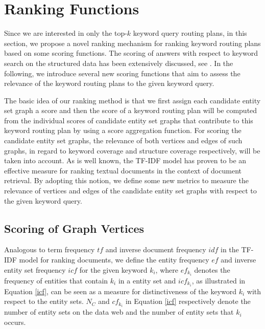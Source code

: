 \section{Ranking Functions}\label{qr:ranking}

Since we are interested in only the top-$k$ keyword query routing plans, in this section, we propose
a novel ranking mechanism for ranking keyword routing plans based on some scoring functions. The
scoring of answers with respect to keyword search on the structured data has been extensively
discussed, see \citep{DBLP:conf/icde/BhalotiaHNCS02, DBLP:conf/sigmod/HeWYY07,
DBLP:conf/vldb/HristidisP02, DBLP:conf/vldb/HristidisGP03, DBLP:conf/sigmod/LiuYMC06,
DBLP:conf/sigmod/LuoLWZ07, DBLP:conf/icde/TranWRC09}. In the following, we introduce several new
scoring functions that aim to assess the relevance of the keyword routing plans to the given keyword
query.

The basic idea of our ranking method is that we first assign each candidate entity set graph a score
and then the score of a keyword routing plan will be computed from the individual scores of candidate
entity set graphs that contribute to this keyword routing plan by using a score aggregation function.
For scoring the candidate entity set graphs, the relevance of both vertices and edges of such graphs,
in regard to keyword coverage and structure coverage respectively, will be taken into account. As is
well known, the \mbox{TF-IDF} model has proven to be an effective measure for ranking textual
documents in the context of document retrieval. By adopting this notion, we define some new metrics
to measure the relevance of vertices and edges of the candidate entity set graphs with respect to the
given keyword query.

\subsection{Scoring of Graph Vertices}

Analogous to term frequency $tf$ and inverse document frequency $idf$ in the \mbox{TF-IDF} model for
ranking documents, we define the entity frequency $ef$ and inverse entity set frequency $icf$ for the
given keyword $k_i$, where $ef_{k_i}$ denotes the frequency of entities that contain $k_i$ in a
entity set and $icf_{k_i}$, as illustrated in Equation \ref{icf},  can be seen as a measure for
distinctiveness of the keyword $k_i$ with respect to the entity sets. $N_C$ and $cf_{k_i}$ in
Equation \ref{icf} respectively denote the number of entity sets on the data web and the number of
entity sets that $k_i$ occurs.

